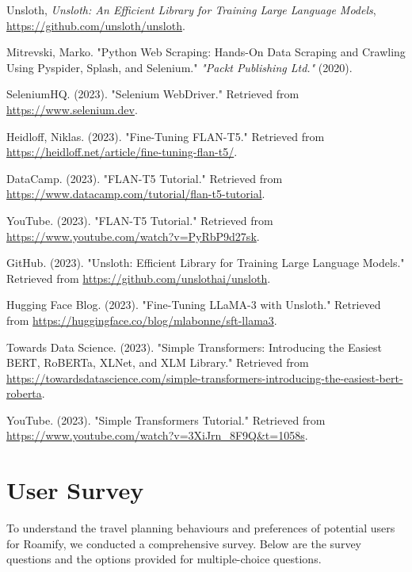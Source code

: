 \documentclass[final,3p,times,authoryear]{elsarticle}
\begin{document}
\begin{thebibliography}{99}
        Unsloth, \emph{Unsloth: An Efficient Library for Training Large Language Models}, \href{https://github.com/unsloth/unsloth}{https://github.com/unsloth/unsloth}.

        Mitrevski, Marko. "Python Web Scraping: Hands-On Data Scraping and Crawling Using Pyspider, Splash, and Selenium." \emph{"Packt Publishing Ltd."} (2020).

        SeleniumHQ. (2023). "Selenium WebDriver." Retrieved from \url{https://www.selenium.dev}.

        Heidloff, Niklas. (2023). "Fine-Tuning FLAN-T5." Retrieved from \url{https://heidloff.net/article/fine-tuning-flan-t5/}.

        DataCamp. (2023). "FLAN-T5 Tutorial." Retrieved from \url{https://www.datacamp.com/tutorial/flan-t5-tutorial}.

        YouTube. (2023). "FLAN-T5 Tutorial." Retrieved from \url{https://www.youtube.com/watch?v=PyRbP9d27sk}.
    
        GitHub. (2023). "Unsloth: Efficient Library for Training Large Language Models." Retrieved from \url{https://github.com/unslothai/unsloth}.
    
        Hugging Face Blog. (2023). "Fine-Tuning LLaMA-3 with Unsloth." Retrieved from \url{https://huggingface.co/blog/mlabonne/sft-llama3}.
    
        Towards Data Science. (2023). "Simple Transformers: Introducing the Easiest BERT, RoBERTa, XLNet, and XLM Library." Retrieved from \url{https://towardsdatascience.com/simple-transformers-introducing-the-easiest-bert-roberta}.
    
        YouTube. (2023). "Simple Transformers Tutorial." Retrieved from \url{https://www.youtube.com/watch?v=3XiJrn_8F9Q&t=1058s}.


\end{thebibliography}

\newpage

\appendix

\section{User Survey}
    To understand the travel planning behaviours and preferences of potential users for Roamify, we conducted a comprehensive survey. Below are the survey questions and the options provided for multiple-choice questions.
\end{document}

